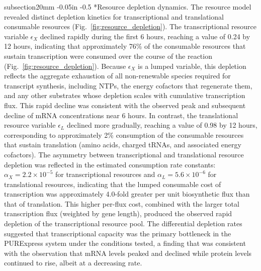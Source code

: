 \documentclass[12pt]{article}
\makeatletter
\renewcommand\subsection{\@startsection
	{subsection}{2}{0mm}
	{-0.05in}
	{-0.5\baselineskip}
	{\normalfont\normalsize\bfseries}}
\makeatother
\begin{document}
\subsection*{Resource depletion dynamics.}
The resource model revealed distinct depletion kinetics for transcriptional and translational consumable resources (Fig.~\ref{fig:resource_depletion}). The transcriptional resource variable $\epsilon_X$ declined rapidly during the first 6 hours, reaching a value of 0.24 by 12 hours, indicating that approximately 76\% of the consumable resources that sustain transcription were consumed over the course of the reaction (Fig.~\ref{fig:resource_depletion}). Because $\epsilon_X$ is a lumped variable, this depletion reflects the aggregate exhaustion of all non-renewable species required for transcript synthesis, including NTPs, the energy cofactors that regenerate them, and any other substrates whose depletion scales with cumulative transcription flux. This rapid decline was consistent with the observed peak and subsequent decline of mRNA concentrations near 6 hours. In contrast, the translational resource variable $\epsilon_L$ declined more gradually, reaching a value of 0.98 by 12 hours, corresponding to approximately 2\% consumption of the consumable resources that sustain translation (amino acids, charged tRNAs, and associated energy cofactors). The asymmetry between transcriptional and translational resource depletion was reflected in the estimated consumption rate constants: $\alpha_X = 2.2 \times 10^{-5}$ for transcriptional resources and $\alpha_L = 5.6 \times 10^{-6}$ for translational resources, indicating that the lumped consumable cost of transcription was approximately 4.0-fold greater per unit biosynthetic flux than that of translation. This higher per-flux cost, combined with the larger total transcription flux (weighted by gene length), produced the observed rapid depletion of the transcriptional resource pool. The differential depletion rates suggested that transcriptional capacity was the primary bottleneck in the PURExpress system under the conditions tested, a finding that was consistent with the observation that mRNA levels peaked and declined while protein levels continued to rise, albeit at a decreasing rate.
\end{document}
